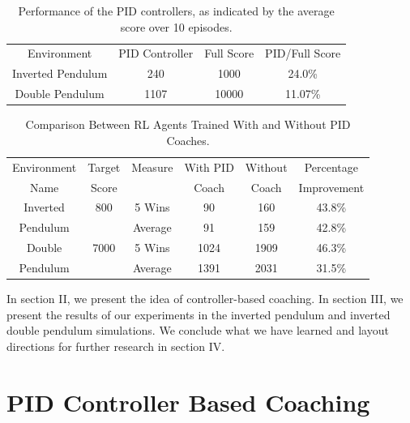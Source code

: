 
\begin{table}
\footnotesize
\caption{Performance of the PID controllers, as indicated by the average score over 10 episodes.}
\label{score_compare}
\centering
\begin{tabular}{ cccc }
\rowcolor{airforceblue}
Environment &   PID Controller &Full Score &PID\slash Full Score \\
Inverted Pendulum &  240 & 1000&  24.0\%\\
\rowcolor{beaublue}

Double Pendulum &  1107 & 10000& 11.07\%\\
\end{tabular}
\end{table}


\begin{table}
\scriptsize
\caption{Comparison Between RL Agents Trained With and Without PID Coaches.}
\label{episode_compare}
\centering
\begin{tabular}{ cccccc }
\rowcolor{airforceblue}

Environment & Target & Measure  &  With PID  & Without  & Percentage\\
\rowcolor{airforceblue}

   Name     & Score  &              & Coach  & Coach  & Improvement \\
Inverted & 800& 5 Wins & 90 & 160&  43.8\% \\
Pendulum & &Average  & 91 &  159&  42.8\%\\
\rowcolor{beaublue}
Double & 7000& 5 Wins & 1024 & 1909&  46.3\%\\
\rowcolor{beaublue}
Pendulum & &Average & 1391 &  2031&  31.5\%\\

\end{tabular}
\end{table}

In section II, we present the idea of controller-based coaching. In section III, we present the results of our experiments in the inverted pendulum and inverted double pendulum simulations. We conclude what we have learned and layout directions for further research in section IV.

\section{PID Controller Based Coaching}

